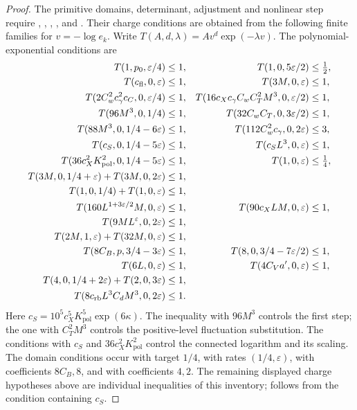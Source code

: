 \begin{proof}
The primitive domains, determinant, adjustment and nonlinear
step require ,
,
,
,
 and
.
Their charge conditions are obtained from the following
finite families for $v=-\log e_k$.
Write $T(A,d,\lambda)=Av^d\exp(-\lambda v)$.
The polynomial-exponential conditions are
\begin{align}
 T(1,p_0,\varepsilon/4)&\le1,&
 T(1,0,5\varepsilon/2)&\le\tfrac12,\notag\\
 T(c_{\mathrm{fl}},0,\varepsilon)&\le1,&
 T(3M,0,\varepsilon)&\le1,\notag\\
 T(2C_w^2c_\gamma^2c_C,0,\varepsilon/4)&\le1,&
 T(16c_Xc_\gamma C_wC_T^2M^3,0,\varepsilon/2)&\le1,\notag\\
 T(96M^3,0,1/4)&\le1,&
 T(32C_wC_T,0,3\varepsilon/2)&\le1,\notag\\
 T(88M^3,0,1/4-6\varepsilon)&\le1,&
 T(112C_w^2c_\gamma,0,2\varepsilon)&\le3,\notag\\
 T(c_S,0,1/4-5\varepsilon)&\le1,&
 T(c_SL^3,0,\varepsilon)&\le1,\notag\\
 T(36c_X^2K_{\mathrm{pol}}^2,0,1/4-5\varepsilon)&\le1,&
 T(1,0,\varepsilon)&\le\tfrac14,\notag\\
 T(3M,0,1/4+\varepsilon)+T(3M,0,2\varepsilon)&\le1,\notag\\
 T(1,0,1/4)+T(1,0,\varepsilon)&\le1,\notag\\
 T(160L^{1+3\varepsilon/2}M,0,\varepsilon)&\le1,&
 T(90c_XLM,0,\varepsilon)&\le1,\notag\\
 T(9ML^\varepsilon,0,2\varepsilon)&\le1,\notag\\
 T(2M,1,\varepsilon)+T(32M,0,\varepsilon)&\le1,\notag\\
 T(8C_B,p,3/4-3\varepsilon)&\le1,&
 T(8,0,3/4-7\varepsilon/2)&\le1,\notag\\
 T(6L,0,\varepsilon)&\le1,&
 T(4C_Va',0,\varepsilon)&\le1,\notag\\
 T(4,0,1/4+2\varepsilon)+T(2,0,3\varepsilon)&\le1,\notag\\
 T(8c_{\mathrm{rb}}L^3C_dM^3,0,2\varepsilon)&\le1.
                                      \label{eq:constants-running-inventory}
\end{align}
Here $c_S=10^5c_X^5K_{\mathrm{pol}}^5\exp(6\kappa)$.
The inequality with $96M^3$ controls the first step;
the one with $C_T^2M^3$ controls the positive-level
fluctuation substitution. The conditions with $c_S$
and $36c_X^2K_{\mathrm{pol}}^2$ control the connected logarithm and its scaling.
The domain conditions occur with target $1/4$,
with rates $(1/4,\varepsilon)$, with coefficients
$8C_B,8$, and with coefficients $4,2$.
The remaining displayed charge hypotheses above are
individual inequalities of this inventory;
 follows from the
condition containing $c_S$.


\end{proof}
